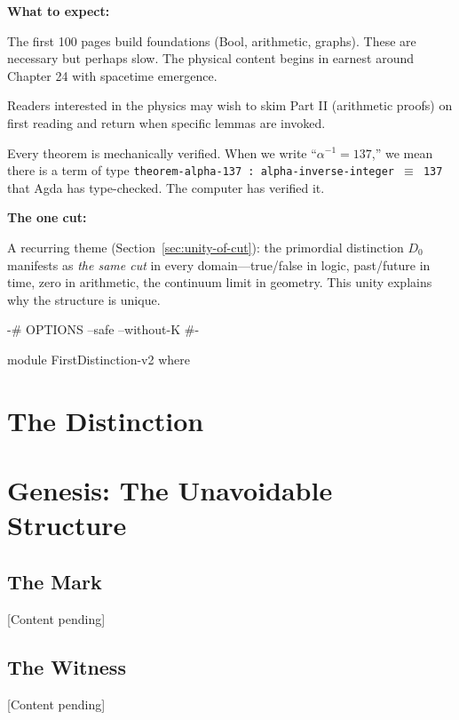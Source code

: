 \documentclass[11pt,a4paper]{book}
\begin{document}
\medskip

\noindent\textbf{What to expect:}

The first 100 pages build foundations (Bool, arithmetic, graphs). These are 
necessary but perhaps slow. The physical content begins in earnest around 
Chapter 24 with spacetime emergence.

Readers interested in the physics may wish to skim Part II (arithmetic proofs) 
on first reading and return when specific lemmas are invoked.

Every theorem is mechanically verified. When we write ``$\alpha^{-1} = 137$,'' 
we mean there is a term of type \texttt{theorem-alpha-137 : alpha-inverse-integer $\equiv$ 137} 
that Agda has type-checked. The computer has verified it.

\medskip

\noindent\textbf{The one cut:}

A recurring theme (Section~\ref{sec:unity-of-cut}): the primordial distinction $D_0$ 
manifests as \emph{the same cut} in every domain---true/false in logic, past/future 
in time, zero in arithmetic, the continuum limit in geometry. This unity explains 
why the structure is unique.

\begin{code}
{-# OPTIONS --safe --without-K #-}

module FirstDistinction-v2 where
\end{code}

\tableofcontents
\mainmatter

\part{The Distinction}


\part{Genesis: The Unavoidable Structure}

\chapter{The Mark}

[Content pending]

\chapter{The Witness}

[Content pending]
\end{document}
